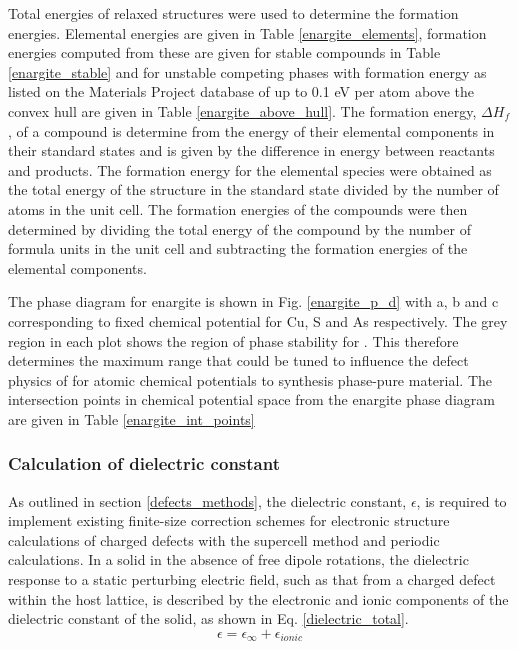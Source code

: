 \documentclass[11pt, twoside]{report}
\begin{document}
Total energies of relaxed structures were used to determine the formation energies. Elemental energies are given in Table \ref{enargite_elements}, formation energies computed from these are given for stable compounds in Table \ref{enargite_stable} and for unstable competing phases with formation energy as listed on the Materials Project database of up to 0.1 eV per atom above the convex hull are given in Table \ref{enargite_above_hull}.
The formation energy, $\Delta H_f$, of a compound is determine from the energy of their elemental components in their standard states and is given by the difference in energy between reactants and products.
The formation energy for the elemental species were obtained as the total energy of the structure in the standard state divided by the number of atoms in the unit cell. The formation energies of the compounds were then determined by dividing the total energy of the compound by the number of formula units in the unit cell and subtracting the formation energies of the elemental components.

The phase diagram for enargite is shown in Fig. \ref{enargite_p_d} with a, b and c corresponding to fixed chemical potential for Cu, S and As respectively. The grey region in each plot shows the region of phase stability for {\enargite}. This therefore determines the maximum range that could be tuned to influence the defect physics of {\enargite} for atomic chemical potentials to synthesis phase-pure material. The intersection points in chemical potential space from the enargite phase diagram are given in Table \ref{enargite_int_points}



\subsubsection{Calculation of dielectric constant}

As outlined in section \ref{defects_methods}, the dielectric constant, $\epsilon$, is required to implement existing finite-size correction schemes for electronic structure calculations of charged defects with the supercell method and periodic calculations. 
In a solid in the absence of free dipole rotations, the dielectric response to a static perturbing electric field, such as that from a charged defect within the host lattice, is described by the electronic and ionic components of the dielectric constant of the solid, as shown in Eq. \ref{dielectric_total}. 
\begin{equation} \label{dielectric_total}
\epsilon = \epsilon_{\infty} + \epsilon_{ionic}
\end{equation}
\end{document}
